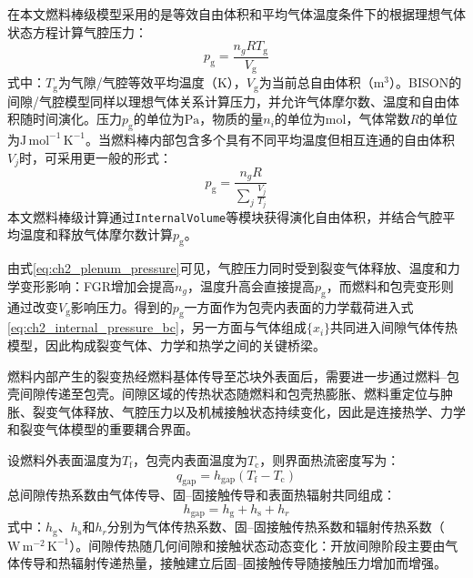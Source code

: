 在本文燃料棒级模型采用的是等效自由体积和平均气体温度条件下的根据理想气体状态方程计算气腔压力：
\begin{equation}
	p_{\mathrm g}
	=\frac{n_gRT_{\mathrm g}}{V_{\mathrm g}}
	\label{eq:ch2_plenum_pressure}
\end{equation}
\noindent 式中：$T_{\mathrm g}$为气隙/气腔等效平均温度（$\mathrm{K}$），$V_{\mathrm g}$为当前总自由体积（$\mathrm{m^3}$）。BISON的间隙/气腔模型同样以理想气体关系计算压力，并允许气体摩尔数、温度和自由体积随时间演化\cite{halesBISONTheoryManual2016}。压力$p_{\mathrm g}$的单位为$\mathrm{Pa}$，物质的量$n_i$的单位为$\mathrm{mol}$，气体常数$R$的单位为$\mathrm{J\,mol^{-1}\,K^{-1}}$。当燃料棒内部包含多个具有不同平均温度但相互连通的自由体积$V_j$时，可采用更一般的形式：
\begin{equation}
	p_{\mathrm g}
	=\frac{n_gR}
	{\displaystyle\sum_j\frac{V_j}{T_j}}
	\label{eq:ch2_plenum_pressure_multivolume}
\end{equation}
本文燃料棒级计算通过\texttt{InternalVolume}等模块获得演化自由体积，并结合气腔平均温度和释放气体摩尔数计算$p_{\mathrm g}$。

由式\eqref{eq:ch2_plenum_pressure}可见，气腔压力同时受到裂变气体释放、温度和力学变形影响：FGR增加会提高$n_g$，温度升高会直接提高$p_{\mathrm g}$，而燃料和包壳变形则通过改变$V_{\mathrm g}$影响压力。得到的$p_{\mathrm g}$一方面作为包壳内表面的力学载荷进入式\eqref{eq:ch2_internal_pressure_bc}，另一方面与气体组成$\{x_i\}$共同进入间隙气体传热模型，因此构成裂变气体、力学和热学之间的关键桥梁。

\label{sec:ch2_gap_heat_transfer}

燃料内部产生的裂变热经燃料基体传导至芯块外表面后，需要进一步通过燃料--包壳间隙传递至包壳。间隙区域的传热状态随燃料和包壳热膨胀、燃料重定位与肿胀、裂变气体释放、气腔压力以及机械接触状态持续变化，因此是连接热学、力学和裂变气体模型的重要耦合界面\cite{hagrmanSCDAPRELAP5MOD1995,luscherMaterialPropertyCorrelations2010,halesBISONTheoryManual2016}。


设燃料外表面温度为$T_{\mathrm f}$，包壳内表面温度为$T_{\mathrm c}$，则界面热流密度写为：
\begin{equation}
	q_{\mathrm{gap}}
	=h_{\mathrm{gap}}
	\left(T_{\mathrm f}-T_{\mathrm c}\right)
	\label{eq:ch2_gap_heat_flux}
\end{equation}
总间隙传热系数由气体传导、固--固接触传导和表面热辐射共同组成：
\begin{equation}
	h_{\mathrm{gap}}
	=h_{\mathrm g}+h_{\mathrm s}+h_r
	\label{eq:ch2_total_gap_conductance}
\end{equation}
\noindent 式中：$h_{\mathrm g}$、$h_{\mathrm s}$和$h_r$分别为气体传热系数、固--固接触传热系数和辐射传热系数（$\mathrm{W\,m^{-2}\,K^{-1}}$）。间隙传热随几何间隙和接触状态动态变化：开放间隙阶段主要由气体传导和热辐射传递热量，接触建立后固--固接触传导随接触压力增加而增强。

